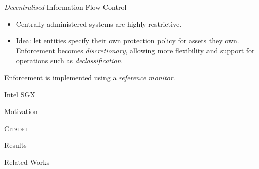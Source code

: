 \documentclass[xcolor=dvipsnames]{beamer}
\begin{document}
\begin{frame}{\textit{Decentralised} Information Flow Control}
    \begin{itemize}
        \item Centrally administered systems are highly restrictive.
        \vspace{5mm}
        \item Idea: let entities specify their own protection policy for assets they own. Enforcement becomes \textit{discretionary}, allowing more flexibility and support for operations such as \textit{declassification}.
    \end{itemize}
    \vspace{5mm}
    Enforcement is implemented using a \textit{reference monitor}.
\end{frame}

\begin{frame}{Intel SGX}
    
\end{frame}


\begin{frame}{Motivation}
    
\end{frame}

\begin{frame}{\textsc{Citadel}}
    
\end{frame}

\begin{frame}{Results}
    
\end{frame}

\begin{frame}{Related Works}
    
\end{frame}
\end{document}
